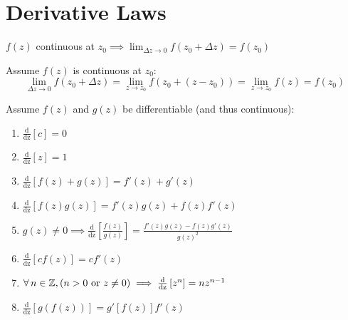 \documentclass[letterpaper,12pt,fleqn]{article}
\newcommand{\dz}[1]{\operatorname{\frac{d}{dz}}\left[#1\right]}
\newcommand{\D}{\Delta}
\newcommand{\Dz}{\D z}
\newcommand{\limz}{\lim_{z\to z_0}}
\newcommand{\limdz}{\lim_{\D z\to0}}
\begin{document}
\section*{Derivative Laws}

\begin{lemma}
  $f(z)$ continuous at $z_0\implies \limdz{f(z_0+\Dz)}=f(z_0)$
\end{lemma}

\begin{theproof}
  Assume $f(z)$ is continuous at $z_0$:
  \[\limdz{f(z_0+\Dz)}=\limz{f(z_0+(z-z_0))}=\limz{f(z)}=f(z_0)\]
\end{theproof}

\begin{theorem}
  Assume $f(z)$ and $g(z)$ be differentiable (and thus continuous):
  \begin{enumerate}
  \item $\dz{c}=0$

  \item $\dz{z}=1$

  \item $\dz{f(z)+g(z)}=f'(z)+g'(z)$

  \item $\dz{f(z)g(z)}=f'(z)g(z)+f(z)f'(z)$

  \item $g(z)\ne0\implies
    \dz{\frac{f(z)}{g(z)}}=\frac{f'(z)g(z)-f(z)g'(z)}{g(z)^2}$

  \item $\dz{cf(z)}=cf'(z)$

  \item $\forall\,n\in\Z,(n>0\ \mbox{or}\ z\ne0)\implies\dz{z^n}=nz^{n-1}$

  \item $\dz{g(f(z))}=g'[f(z)]f'(z)$
  \end{enumerate}
\end{theorem}
\end{document}
